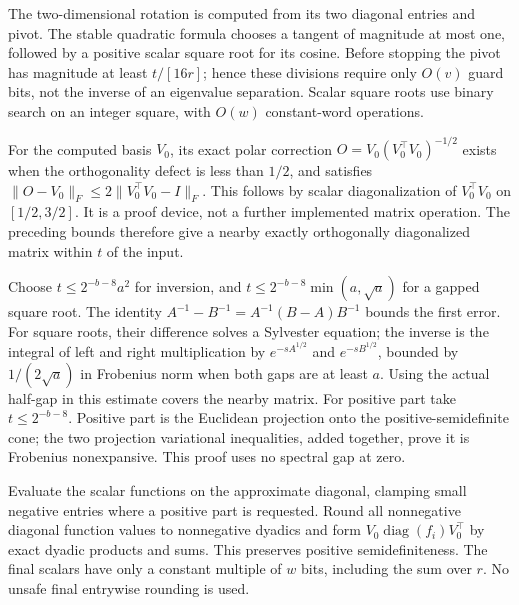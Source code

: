 
The two-dimensional rotation is computed from its two diagonal entries and pivot. The stable quadratic formula chooses a tangent of magnitude at most one, followed by a positive scalar square root for its cosine. Before stopping the pivot has magnitude at least \(t/[16r]\); hence these divisions require only \(O(v)\) guard bits, not the inverse of an eigenvalue separation. Scalar square roots use binary search on an integer square, with \(O(w)\) constant-word operations.



For the computed basis \(V_0\), its exact polar correction \(O=V_0(V_0^\top V_0)^{-1/2}\) exists when the orthogonality defect is less than \(1/2\), and satisfies \(\|O-V_0\|_F\le2\|V_0^\top V_0-I\|_F\). This follows by scalar diagonalization of \(V_0^\top V_0\) on \([1/2,\allowbreak 3/2]\). It is a proof device, not a further implemented matrix operation. The preceding bounds therefore give a nearby exactly orthogonally diagonalized matrix within \(t\) of the input.



Choose \(t\le 2^{-b-8}a^2\) for inversion, and \(t\le 2^{-b-8}\min(a,\allowbreak \sqrt a)\) for a gapped square root. The identity \(A^{-1}-B^{-1}=A^{-1}(B-A)B^{-1}\) bounds the first error. For square roots, their difference solves a Sylvester equation; the inverse is the integral of left and right multiplication by \(e^{-sA^{1/2}}\) and \(e^{-sB^{1/2}}\), bounded by \(1/(2\sqrt a)\) in Frobenius norm when both gaps are at least \(a\). Using the actual half-gap in this estimate covers the nearby matrix. For positive part take \(t\le2^{-b-8}\). Positive part is the Euclidean projection onto the positive-semidefinite cone; the two projection variational inequalities, added together, prove it is Frobenius nonexpansive. This proof uses no spectral gap at zero.



Evaluate the scalar functions on the approximate diagonal, clamping small negative entries where a positive part is requested. Round all nonnegative diagonal function values to nonnegative dyadics and form \(V_0\operatorname{diag}(f_i)V_0^\top\) by exact dyadic products and sums. This preserves positive semidefiniteness. The final scalars have only a constant multiple of \(w\) bits, including the sum over \(r\). No unsafe final entrywise rounding is used.


